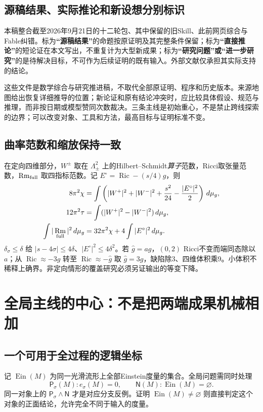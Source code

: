 \documentclass[UTF8,fontset=fandol,zihao=-4]{ctexart}
\theoremstyle{research}
\DeclareMathOperator{\Ric}{Ric}\DeclareMathOperator{\Rm}{Rm}
\begin{document}
\subsection{源稿结果、实际推论和新设想分别标识}
本稿整合截至2026年9月21日的十二轮包\cite{Package}、其中保留的旧Skill\cite{Baseline}、此前网页综合与Fable纠错。标为\textbf{“源稿结果”}的命题按原证明及其完整条件保留；标为\textbf{“直接推论”}的短论证在本文写出，不重复计为大型新成果；标为\textbf{“研究问题”或“进一步研究”}的是待解决目标，不可作为后续证明的既有输入。外部文献仅承担其实际支持的结论。

这些文件是数学综合与研究推进稿，不取代全部原证明、程序和历史版本。来源地图给出恢复详细推导的位置；新论证和原有结论冲突时，应比较具体假设、规范与推理，而非按日期或模型赞同次数裁决。三条主线是初始重心，不是禁止跨线探索的边界；可以改变对象、工具和方法，最高目标与证明标准不变。

\subsection{曲率范数和缩放保持一致}
在定向四维部分，$W^\pm$ 取在 $\Lambda^2_\pm$ 上的Hilbert--Schmidt\emph{算子}范数，Ricci取张量范数，$\Rm_{\rm full}$ 取四指标范数。记 $E^\circ=\Ric-(s/4)g$，则
\begin{align}
 8\pi^2\chi&=\int\left(|W^+|^2+|W^-|^2+\frac{s^2}{24}-\frac{|E^\circ|^2}{2}\right)\dd,\label{eq:cgb}\\
 12\pi^2\tau&=\int(|W^+|^2-|W^-|^2)\dd,\\
 \int|\Rm_{\rm full}|^2\dd&=32\pi^2\chi+4\int|E^\circ|^2\dd.\label{eq:rm}
\end{align}
$\delta_\sigma\le\delta$ 给 $|s-4\sigma|\le4\delta$、$|E^\circ|^2\le4\delta^2$。若 $\widehat g=ag$，$(0,2)$ Ricci不变而端同态除以 $a$；从 $\Ric\approx-3g$ 转至 $\Ric\approx-\widehat g$ 取 $\widehat g=3g$，缺陷除3、四维体积乘9。小体积不稀释上确界。非定向情形的覆盖研究必须另证输出的等变下降。
\section{全局主线的中心：不是把两端成果机械相加}
\subsection{一个可用于全过程的逻辑坐标}
记 $\operatorname{Ein}(M)$ 为同一光滑流形上全部Einstein度量的集合。全局问题需同时处理
\[
 \mathsf P_\sigma(M):e_\sigma(M)=0,
 \qquad \mathsf N(M):\operatorname{Ein}(M)=\varnothing.
\]
同一对象上的 $\mathsf P_\sigma\land\mathsf N$ 才是对应分支反例。证明 $\operatorname{Ein}(M)\ne\varnothing$ 则直接判定这个对象的正面结论，允许完全不同于输入的度量。
\end{document}
